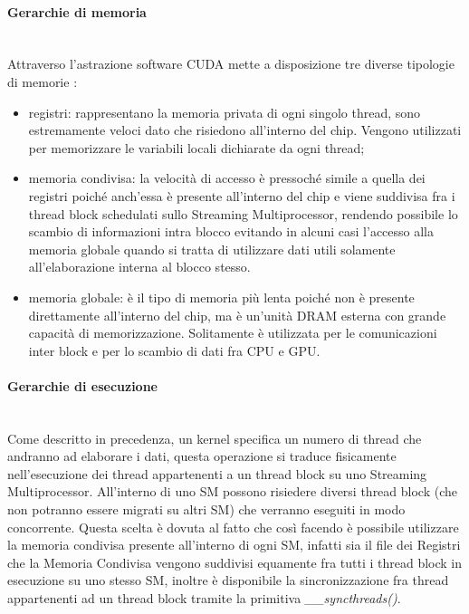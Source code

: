 \paragraph{Gerarchie di memoria}\mbox{}
\\
Attraverso l'astrazione software CUDA mette a disposizione tre diverse
tipologie di memorie \cite{kirk2007nvidia}:

\begin{itemize}
    \item registri: rappresentano la memoria privata di ogni singolo thread,
        sono estremamente veloci dato che risiedono all'interno del chip.
        Vengono utilizzati per memorizzare le
        variabili locali dichiarate da ogni thread;
    
    \item memoria condivisa: la velocità di accesso è pressoché simile a quella
        dei registri poiché anch'essa è presente all'interno del chip e viene
        suddivisa fra i thread block schedulati sullo Streaming Multiprocessor,
        rendendo possibile lo scambio di informazioni intra blocco evitando
        in alcuni casi l'accesso alla memoria globale quando si tratta di
        utilizzare dati utili solamente all'elaborazione interna al
        blocco stesso.

    \item memoria globale: è il tipo di memoria più lenta poiché non è presente
        direttamente all'interno del chip, ma è un'unità DRAM esterna con grande
        capacità di memorizzazione. Solitamente è utilizzata per le
        comunicazioni inter block e per lo scambio di dati fra CPU e GPU.
\end{itemize}

\paragraph{Gerarchie di esecuzione}\mbox{}
\\
Come descritto in precedenza, un kernel specifica un numero di thread che
andranno ad elaborare i dati, questa operazione si traduce fisicamente
nell'esecuzione dei thread appartenenti a un thread block su uno
Streaming Multiprocessor. All'interno di uno SM possono risiedere
diversi thread block (che non potranno essere migrati su altri SM)
che verranno eseguiti in modo concorrente. Questa scelta è dovuta al fatto
che così facendo è possibile utilizzare la memoria condivisa presente
all'interno di ogni SM, infatti sia il file dei Registri che la Memoria
Condivisa vengono suddivisi equamente fra tutti i thread block in esecuzione
su uno stesso SM, inoltre è disponibile la sincronizzazione fra thread
appartenenti ad un thread block tramite la primitiva \textit{\_\_syncthreads()}.

